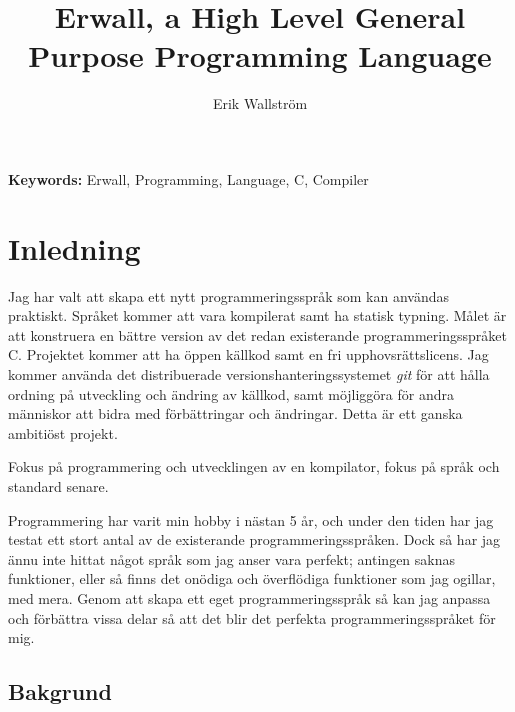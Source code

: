\documentclass{theme}
\begin{document}
\title{Erwall, a High Level General Purpose Programming Language}
\subtitle{}
\author{Erik Wallström}
\maketitle
\newpage

\begin{abstract}
\end{abstract}

\begin{flushleft}
	{\small {\bf Keywords:} Erwall, Programming, Language, C, Compiler}
\end{flushleft}

\tableofcontents
{}
\newpage
{}

\section{Inledning}

Jag har valt att skapa ett nytt programmeringsspråk som kan användas praktiskt. 
Språket kommer att vara kompilerat samt ha statisk typning. Målet är att 
konstruera en bättre version av det redan existerande programmeringsspråket C. 
Projektet kommer att ha öppen källkod samt en fri upphovsrättslicens. Jag kommer
använda det distribuerade versionshanteringssystemet \textit{git} för att hålla 
ordning på utveckling och ändring av källkod, samt möjliggöra för andra 
människor att bidra med förbättringar och ändringar. Detta är ett ganska 
ambitiöst projekt.

Fokus på programmering och utvecklingen av en kompilator, fokus på språk och 
standard senare. 

Programmering har varit min hobby i nästan 5 år, och under den tiden har jag 
testat ett stort antal av de existerande programmeringsspråken. Dock så har jag 
ännu inte hittat något språk som jag anser vara perfekt; antingen saknas 
funktioner, eller så finns det onödiga och överflödiga funktioner som jag 
ogillar, med mera. Genom att skapa ett eget programmeringsspråk så kan jag 
anpassa och förbättra vissa delar så att det blir det perfekta 
programmeringsspråket för mig. 


\subsection{Bakgrund}
\end{document}
